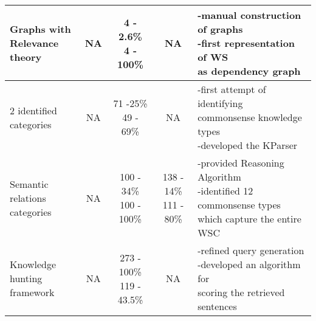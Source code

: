 {\begin{tabularx}{\textwidth}{ l| c c c l }
		\makecell{Graphs with \\Relevance theory \cite{DBLP:conf/kr/Schuller14}} & NA  & \makecell{4 - 2.6\% \\ 4 - 100\%} & NA &\makecell[l]{-manual construction of graphs\\-first representation of WS\\ as dependency graph}\\\hline
		
		\makecell{2 identified \\categories \cite{DBLP:conf/ijcai/SharmaVAB15}} & NA  & \makecell{71 -25\% \\ 49 - 69\%} & NA &\makecell[l]{-first attempt of identifying\\commonsense knowledge types \\-developed the KParser} \\\hline
		
		\makecell{Semantic relations\\ categories \cite{2018CommonsenseKT}} & NA &\makecell{100 - 34\% \\ 100 - 100\%} &  \makecell{138 - 14\% \\ 111 - 80\%} &\makecell[l]{-provided Reasoning Algorithm\\ -identified 12 commonsense types\\ which capture the entire WSC}  \\\hline
		
		\makecell{Knowledge hunting\\ framework \cite{DBLP:conf/emnlp/EmamiCTSC18}}& NA & \makecell{273 - 100\% \\ 119 - 43.5\%} & NA & \makecell[l]{-refined query generation\\-developed an algorithm for \\scoring the retrieved sentences}\\\hline
		
	\end{tabularx}
}